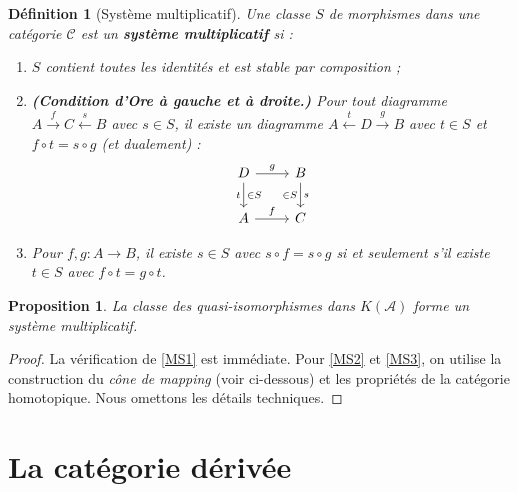 \documentclass[a4paper,12pt]{book}
\newtheorem{proposition}[theoreme]{Proposition}
\newtheorem{definition}[theoreme]{Définition}
\begin{document}
\begin{definition}[Système multiplicatif]\label{def:multiplicative-system}
Une classe $S$ de morphismes dans une catégorie $\mathcal{C}$ est un
\textbf{système multiplicatif} si :
\begin{enumerate}[label=(MS\arabic*)]
\item\label{MS1} $S$ contient toutes les identités et est stable par
  composition ;
\item\label{MS2} \textbf{(Condition d'Ore à gauche et à droite.)}
  Pour tout diagramme $A \xrightarrow{f} C \xleftarrow{s} B$ avec
  $s \in S$, il existe un diagramme $A \xleftarrow{t} D \xrightarrow{g} B$
  avec $t \in S$ et $f \circ t = s \circ g$ (et dualement) :
\[
\begin{tikzcd}
D \arrow[r, "g"] \arrow[d, "t"', "{\in S}"] & B \arrow[d, "s", "{\in S}"'] \\
A \arrow[r, "f"] & C
\end{tikzcd}
\]
\item\label{MS3} Pour $f, g \colon A \to B$, il existe $s \in S$ avec
  $s \circ f = s \circ g$ si et seulement s'il existe $t \in S$ avec
  $f \circ t = g \circ t$.
\end{enumerate}
\end{definition}

\begin{proposition}\label{prop:qiso-multiplicative}
La classe des quasi-isomorphismes dans $K(\mathcal{A})$ forme un
système multiplicatif.
\end{proposition}

\begin{proof}
La vérification de \ref{MS1} est immédiate.
Pour \ref{MS2} et \ref{MS3}, on utilise la construction du
\emph{cône de mapping} (voir ci-dessous) et
les propriétés de la catégorie homotopique. Nous omettons les détails
techniques.
\end{proof}


\section{La catégorie dérivée}\label{sec:derived-category}
\end{document}
